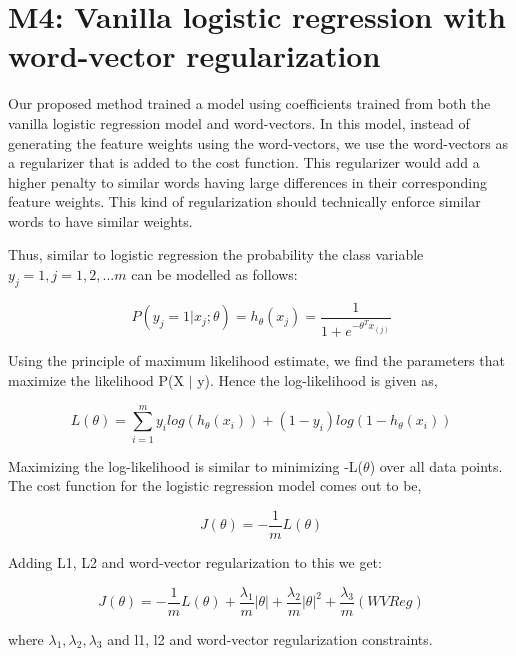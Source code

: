 \section{M4: Vanilla logistic regression with word-vector regularization}

Our proposed method trained a model using coefficients trained from both the vanilla logistic regression model and word-vectors. In this model, instead of generating the feature weights using the word-vectors, we use the word-vectors as a regularizer that is added to the cost function. This regularizer would add a higher penalty to similar words having large differences in their corresponding feature weights. This kind of regularization should technically enforce similar words to have similar weights.

Thus, similar to logistic regression the probability the class variable $y_{j}=1, j=1,2,...m$ can be modelled as follows:

\begin{equation}
\ P(y_{j}  = 1 | x_{j}; \theta) = h_{\theta}(x_{j}) = \frac{1}{1+e^{-\theta^{T}x_{(j)}}}
\end{equation}

Using the principle of maximum likelihood estimate, we find the parameters that maximize the likelihood P(X $|$ y). Hence the log-likelihood is given as,

\begin{equation}
\ L(\theta) = \sum_{i=1}^{m}{y_{i}log(h_{\theta}(x_{i})) + (1-y_{i})log(1-h_{\theta}(x_{i}))}
\end{equation}

Maximizing the log-likelihood is similar to minimizing -L($\theta$) over all data points. The cost function for the logistic regression model comes out to be,

\begin{equation}
\ J(\theta) = -\frac{1}{m}{L(\theta)}
\end{equation}

Adding L1, L2 and word-vector regularization to this we get:

\begin{equation}
\ J(\theta) = -\frac{1}{m}{L(\theta)} + \frac{\lambda_{1}}{m}{|{\theta}|} + \frac{\lambda_{2}}{m}{|{\theta}|}^{2} + 
\frac{\lambda_{3}}{m}{(WV Reg)}
\end{equation}

where $\lambda_{1}, \lambda_{2}, \lambda_{3}$ and l1, l2 and word-vector regularization constraints.\\

